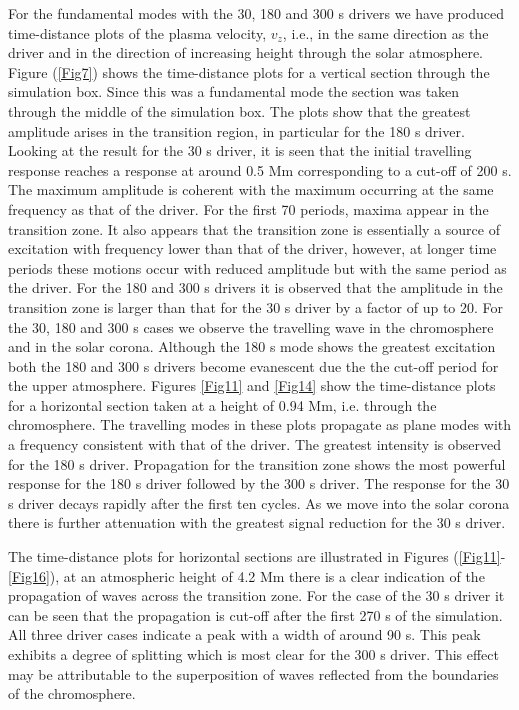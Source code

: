 \documentclass[preprint,authoryear,12pt]{elsarticle}
\begin{document}
For the fundamental modes with the 30, 180 and 300 s drivers we have produced time-distance plots of the plasma velocity, $v_z$, i.e., in the same direction as the driver and in the direction of increasing height through the solar atmosphere.  Figure (\ref{Fig7})
 shows the time-distance plots for a vertical section through the simulation box. Since this was a fundamental mode the section was taken through the middle of the simulation box. The plots show that the greatest amplitude arises in the transition region, in particular for the 180 s driver. Looking at the result for the 30 s driver, it is seen that the initial travelling response reaches a response at around 0.5 Mm corresponding to a cut-off of 200 s. The maximum amplitude is coherent with the maximum occurring at the same frequency as that of the driver. For the first 70 periods, maxima appear in the transition zone. It also appears that the transition zone is essentially a source of excitation with frequency lower than that of the driver, however, at longer time periods these motions occur with reduced amplitude but with the same period as the driver. For the 180 and 300 s drivers it is observed that the amplitude in the transition zone is larger than that for the 30 s driver by a factor of up to 20. For the 30, 180 and 300 s cases we observe the travelling wave in the chromosphere and in the solar corona. Although the 180 s mode shows the greatest excitation both the 180 and 300 s drivers become evanescent due the the cut-off period for the upper atmosphere. Figures \ref{Fig11} and \ref{Fig14} show the time-distance plots for a horizontal section taken at a height of 0.94 Mm, i.e. through the chromosphere. The travelling modes in these plots propagate as plane modes with a frequency consistent with that of the driver. The greatest intensity is observed for the 180 s driver. Propagation for the transition zone shows the most powerful response for the 180 s driver followed by the 300 s driver. The response for the 30 s driver decays rapidly after the first ten cycles. As we move into the solar corona there is further attenuation with the greatest signal reduction for the 30 s driver.

The time-distance plots for horizontal sections are illustrated in Figures (\ref{Fig11}-\ref{Fig16}), at an atmospheric height of 4.2 Mm there is a clear indication of the propagation of waves across the transition zone. For the case of the 30 s driver it can be seen that  the propagation is cut-off after the first 270 s of the simulation. All three driver cases indicate a peak with a width of around 90 s. This peak exhibits a degree of splitting which is most clear for the 300 s driver.  This effect may be attributable to the superposition of waves reflected from the boundaries of the chromosphere.
\end{document}

